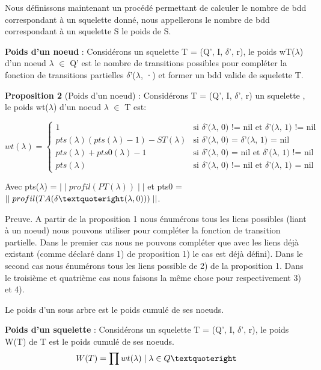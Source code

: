 \documentclass[french]{article}
\begin{document}
Nous définissons maintenant un procédé permettant de calculer le nombre de bdd correspondant à un squelette donné, nous appellerons le nombre de bdd correspondant à un squelette S le poids de S.

\textbf{Poids d'un noeud} : Considérons un squelette T = (Q’, I, \(\delta\)’, r), le poids wT(\(\lambda\)) d'un noeud \(\lambda\) \(\in\) Q’ est le nombre de transitions possibles pour compléter la fonction de transitions partielles \(\delta\)’(\(\lambda\), ·) et former un bdd valide de squelette T.

\textbf{Proposition 2} (Poids d'un noeud) : Considérons T = (Q’, I, \(\delta\)’, r) un squelette , le poids wt(\(\lambda\)) d'un noeud \(\lambda\) \(\in\) T est:

\begin{equation}
    wt(\lambda) =
    \begin{cases}
        1 & \text{si \(\delta\)’(\(\lambda\), 0) != nil et \(\delta\)’(\(\lambda\), 1) != nil}\\
        pts(\lambda) (pts(\lambda) - 1) - ST(\lambda) & \text{si \(\delta\)’(\(\lambda\), 0) = \(\delta\)’(\(\lambda\), 1) = nil}\\
        pts(\lambda) + pts0(\lambda) - 1  & \text{si \(\delta\)’(\(\lambda\), 0) = nil et \(\delta\)’(\(\lambda\), 1) != nil}\\
        pts(\lambda)   & \text{si \(\delta\)’(\(\lambda\), 0) != nil et \(\delta\)’(\(\lambda\), 1) = nil}
    \end{cases}       
\end{equation}

Avec pts(\(\lambda\)) = \(\mid\mid profil(PT(\lambda)) \mid\mid\) et pts0 = \(\mid\mid profil(TA(\delta \textquoteright(\lambda,0))) \mid\mid\).

Preuve. A partir de la proposition 1 nous énumérons tous les liens possibles (liant à un noeud) nous pouvons utiliser pour compléter la fonction de transition partielle. Dans le premier cas nous ne pouvons compléter que avec les liens déjà existant (comme déclaré dans 1) de proposition 1) le cas est déjà défini). Dans le second cas nous énumérons tous les liens possible de 2) de la proposition 1. Dans le troisième et quatrième cas nous faisons la même chose pour respectivement  3) et 4).
\vspace{5mm} 

Le poids d'un sous arbre est le poids cumulé de ses noeuds.

\textbf{Poids d'un squelette} : Considérons un squelette T = (Q’, I, \(\delta\)’, r), le poids W(T) de T est le poids cumulé de ses noeuds.
\[W(T) = \prod wt(\lambda) \mid \lambda \in Q\textquoteright\]
\end{document}
